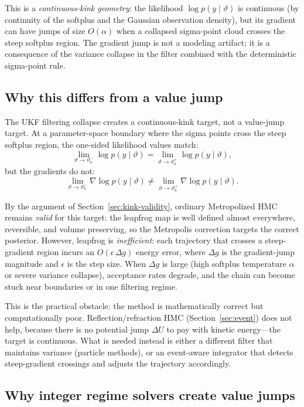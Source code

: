 \documentclass[11pt]{article}
\begin{document}
This is a \emph{continuous-kink geometry}: the likelihood
$\log p(y\mid\vartheta)$ is continuous (by continuity of the softplus and the
Gaussian observation density), but its gradient can have jumps of size
$O(\alpha)$ when a collapsed sigma-point cloud crosses the steep softplus
region. The gradient jump is not a modeling artifact; it is a consequence of
the variance collapse in the filter combined with the deterministic sigma-point
rule.

\subsection{Why this differs from a value jump}\label{sec:kink-vs-jump-ukf}

The UKF filtering collapse creates a continuous-kink target, not a value-jump
target. At a parameter-space boundary where the sigma points cross the steep
softplus region, the one-sided likelihood values match:
\[
 \lim_{\vartheta\to\vartheta_b^-}\log p(y\mid\vartheta)
 = \lim_{\vartheta\to\vartheta_b^+}\log p(y\mid\vartheta),
\]
but the gradients do not:
\[
 \lim_{\vartheta\to\vartheta_b^-}\nabla\log p(y\mid\vartheta)
 \ne \lim_{\vartheta\to\vartheta_b^+}\nabla\log p(y\mid\vartheta).
\]

By the argument of Section~\ref{sec:kink-validity}, ordinary Metropolized HMC
remains \emph{valid} for this target: the leapfrog map is well defined almost
everywhere, reversible, and volume preserving, so the Metropolis correction
targets the correct posterior. However, leapfrog is \emph{inefficient}: each
trajectory that crosses a steep-gradient region incurs an $O(\epsilon\,\Delta
g)$ energy error, where $\Delta g$ is the gradient-jump magnitude and
$\epsilon$ is the step size. When $\Delta g$ is large (high softplus
temperature $\alpha$ or severe variance collapse), acceptance rates degrade,
and the chain can become stuck near boundaries or in one filtering regime.

This is the practical obstacle: the method is mathematically correct but
computationally poor. Reflection/refraction HMC (Section~\ref{sec:event}) does
not help, because there is no potential jump $\Delta U$ to pay with kinetic
energy—the target is continuous. What is needed instead is either a different
filter that maintains variance (particle methods), or an event-aware integrator
that detects steep-gradient crossings and adjusts the trajectory accordingly.

\subsection{Why integer regime solvers create value jumps}\label{sec:integer-regime-jumps}
\end{document}
